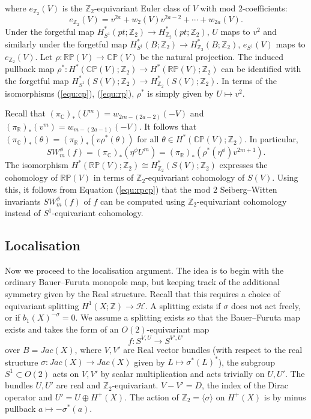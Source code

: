 \documentclass{amsart}
\theoremstyle{definition}
\theoremstyle{remark}
\numberwithin{equation}{section}
\begin{document}
where $e_{\mathbb{Z}_2}(V)$ is the $\mathbb{Z}_2$-equivariant Euler class of $V$ with mod $2$-coefficients:
\[
e_{\mathbb{Z}_2}(V) = v^{2a} + w_2(V) v^{2a-2} + \cdots + w_{2a}(V).
\]
Under the forgetful map $H^*_{S^1}(pt ; \mathbb{Z}_2) \to H^*_{\mathbb{Z}_2}(pt ; \mathbb{Z}_2)$, $U$ maps to $v^2$ and similarly under the forgetful map $H^*_{S^1}(B ; \mathbb{Z}_2) \to H^*_{\mathbb{Z}_2}(B ; \mathbb{Z}_2)$, $e_{S^1}(V)$ maps to $e_{\mathbb{Z}_2}(V)$. Let $\rho : \mathbb{RP}(V) \to \mathbb{CP}(V)$ be the natural projection. The induced pullback map $\rho^* : H^*( \mathbb{CP}(V) ; \mathbb{Z}_2) \to H^*(\mathbb{RP}(V) ; \mathbb{Z}_2)$ can be identified with the forgetful map $H^*_{S^1}(S(V) ; \mathbb{Z}_2) \to H^*_{\mathbb{Z}_2}(S(V) ; \mathbb{Z}_2)$. In terms of the isomorphisms (\ref{equ:cp}), (\ref{equ:rp}), $\rho^*$ is simply given by $U \mapsto v^2$.

Recall that $(\pi_{\mathbb{C}})_*( U^m ) = w_{2m-(2a-2)}(-V)$ and $(\pi_{\mathbb{R}})_*( v^m ) = w_{m-(2a-1)}(-V)$. It follows that $(\pi_{\mathbb{C}})_*( \theta ) = (\pi_{\mathbb{R}})_*( v \rho^*(\theta) )$ for all $\theta \in H^*(\mathbb{CP}(V) ; \mathbb{Z}_2)$. In particular, 
\begin{equation}\label{equ:rpcp}
SW_m^\phi(f) = (\pi_{\mathbb{C}})_*( \eta^\phi U^m ) = (\pi_{\mathbb{R}})_*( \rho^*(\eta^\phi) v^{2m+1} ).
\end{equation}
The isomorphism $H^*( \mathbb{RP}(V) ; \mathbb{Z}_2 ) \cong H^*_{\mathbb{Z}_2}( S(V) ; \mathbb{Z}_2)$ expresses the cohomology of $\mathbb{RP}(V)$ in terms of $\mathbb{Z}_2$-equivariant cohomology of $S(V)$. Using this, it follows from Equation (\ref{equ:rpcp}) that the mod $2$ Seiberg--Witten invariants $SW^\phi_m(f)$ of $f$ can be computed using $\mathbb{Z}_2$-equivariant cohomology instead of $S^1$-equivariant cohomology.

\subsection{Localisation}\label{sec:loc2}

Now we proceed to the localisation argument. The idea is to begin with the ordinary Bauer--Furuta monopole map, but keeping track of the additional symmetry given by the Real structure. Recall that this requires a choice of equivariant splitting $H^1(X ; \mathbb{Z}) \to \mathcal{H}$. A splitting exists if $\sigma$ does not act freely, or if $b_1(X)^{-\sigma} = 0$. We assume a splitting exists so that the Bauer--Furuta map exists and takes the form of an $O(2)$-equivariant map
\[
f : S^{V,U} \to S^{V',U'}
\]
over $B = Jac(X)$, where $V,V'$ are Real vector bundles (with respect to the real structure $\sigma : Jac(X) \to Jac(X)$ given by $L \mapsto \sigma^*(L)^*$), the subgroup $S^1 \subset O(2)$ acts on $V,V'$ by scalar multiplication and acts trivially on $U,U'$. The bundles $U,U'$ are real and $\mathbb{Z}_2$-equivariant. $V - V' = D$, the index of the Dirac operator and $U' = U \oplus H^+(X)$. The action of $\mathbb{Z}_2 = \langle \sigma \rangle$ on $H^+(X)$ is by minus pullback $a \mapsto -\sigma^*(a)$.
\end{document}
